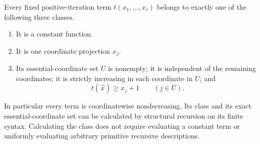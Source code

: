 \begin{theorem}
\label{thm:positive-classification}
Every fixed positive-iteration term $t(x_1,\ldots,x_r)$ belongs to exactly
one of the following three classes.
\begin{enumerate}
\item It is a constant function.
\item It is one coordinate projection $x_j$.
\item Its essential-coordinate set $U$ is nonempty; it is independent of
      the remaining coordinates; it is strictly increasing in each
      coordinate in $U$; and
      \[
             t(\vec x)\geq x_j+1\qquad(j\in U).
      \]
\end{enumerate}
In particular every term is coordinatewise nondecreasing. Its class and
its exact essential-coordinate set can be calculated by structural
recursion on its finite syntax. Calculating the class does not require
evaluating a constant term or uniformly evaluating arbitrary primitive
recursive descriptions.
\end{theorem}


